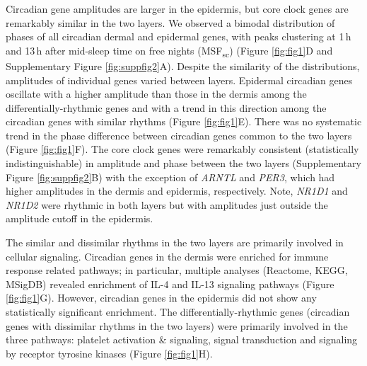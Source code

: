 Circadian gene amplitudes are larger in the epidermis, but core clock genes are remarkably similar in the two layers. We observed a bimodal distribution of phases of all circadian dermal and epidermal genes, with peaks clustering at 1\,h and 13\,h after mid-sleep time on free nights (MSF\textsubscript{sc}) (Figure \ref{fig:fig1}D and Supplementary Figure \ref{fig:suppfig2}A). Despite the similarity of the distributions, amplitudes of individual genes varied between layers. Epidermal circadian genes oscillate with a higher amplitude than those in the dermis among the differentially-rhythmic genes and with a trend in this direction among the circadian genes with similar rhythms (Figure \ref{fig:fig1}E). There was no systematic trend in the phase difference between circadian genes common to the two layers (Figure \ref{fig:fig1}F). The core clock genes were remarkably consistent (statistically indistinguishable) in amplitude and phase between the two layers (Supplementary Figure \ref{fig:suppfig2}B) with the exception of \textit{ARNTL} and \textit{PER3}, which had higher amplitudes in the dermis and epidermis, respectively. Note, \textit{NR1D1} and \textit{NR1D2} were rhythmic in both layers but with amplitudes just outside the amplitude cutoff in the epidermis.

The similar and dissimilar rhythms in the two layers are primarily involved in cellular signaling. Circadian genes in the dermis were enriched for immune response related pathways; in particular, multiple analyses (Reactome, KEGG, MSigDB) revealed enrichment of IL-4 and IL-13 signaling pathways (Figure \ref{fig:fig1}G). However, circadian genes in the epidermis did not show any statistically significant enrichment. The differentially-rhythmic genes (circadian genes with dissimilar rhythms in the two layers) were primarily involved in the three pathways: platelet activation \& signaling, signal transduction and signaling by receptor tyrosine kinases (Figure \ref{fig:fig1}H). %


